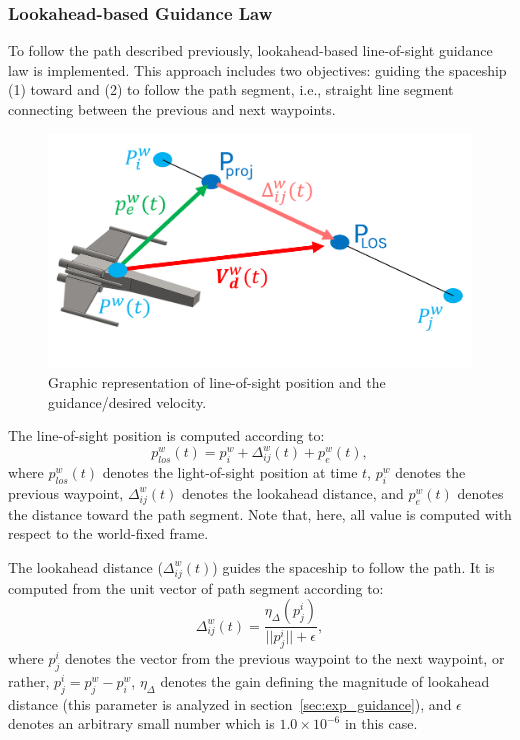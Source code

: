 \subsubsection{Lookahead-based Guidance Law}
To follow the path described previously, lookahead-based line-of-sight guidance law is implemented. This approach includes two objectives: guiding the spaceship (1) toward and (2) to follow the path segment, i.e., straight line segment connecting between the previous and next waypoints.

\begin{figure}[h]
		\centering
		\includegraphics[width=0.7\linewidth]{figures/lookahead_normal.png}
	\caption{Graphic representation of line-of-sight position and the guidance/desired velocity.}
	\label{fig:lookahead}
\end{figure}

The line-of-sight position is computed according to:
\begin{equation}
p^w_{los}(t) = p^w_i + \Delta^w_{ij}(t) + p^w_e(t),
\label{eq:guidance_plos}
\end{equation}
where $p^w_{los}(t)$ denotes the light-of-sight position at time $t$, $p^w_i$ denotes the previous waypoint, $\Delta^w_{ij}(t)$ denotes the lookahead distance, and $p^w_e(t)$ denotes the distance toward the path segment. Note that, here, all value is computed with respect to the world-fixed frame.

The lookahead distance ($\Delta^w_{ij}(t)$) guides the spaceship to follow the path. It is computed from the unit vector of path segment according to:
\begin{equation}
\Delta^w_{ij}(t) = \frac{  \eta_\Delta  (p_j^i)}{||p_j^i||+\epsilon},
\label{eq:guidance_delta}
\end{equation}
where $p_j^i$ denotes the vector from the previous waypoint to the next waypoint, or rather, $p_j^i = p^w_j-p^w_i$, $\eta_\Delta$ denotes the gain defining the magnitude of lookahead distance (this parameter is analyzed in section~\ref{sec:exp_guidance}), and $\epsilon$ denotes an arbitrary small number which is $1.0\times10^{-6}$ in this case.

